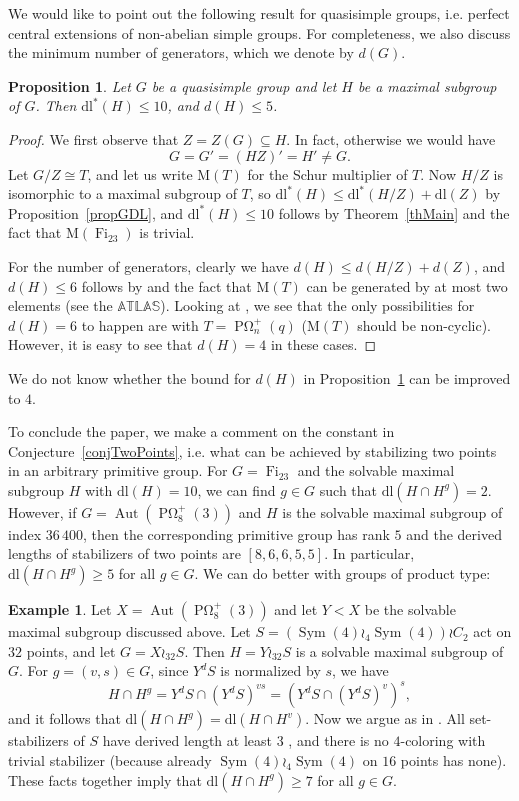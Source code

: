 \documentclass[11pt]{amsart}
\numberwithin{equation}{section}
\newtheorem{proposition}[theorem]{Proposition}
\theoremstyle{definition}
\newtheorem{example}[theorem]{Example}
\theoremstyle{remark}
\newcommand{\Sym}{\mathop{\mathrm{Sym}}}
\newcommand{\Aut}{\mathop{\mathrm{Aut}}}
\newcommand{\Fi}{\mathop{\mathrm{Fi}}}
\newcommand{\dll}{\mathrm{dl^*}}
\newcommand{\dl}{\mathrm{dl}}
\DeclareMathOperator{\POmega}{P \Omega}
\newcommand{\Atlas}{\mathbb{A}\mathbb{T}\mathbb{L}\mathbb{A}\mathbb{S}}
\begin{document}
We would like to point out the following result for quasisimple groups,
i.e. perfect central extensions of non-abelian simple groups.
For completeness, we also discuss the minimum
number of generators, which we denote by $d(G)$.

\begin{proposition} \label{propQS}
Let $G$ be a quasisimple group and let $H$ be a maximal subgroup of
$G$. Then $\dll(H) \leq 10$, and $d(H) \leq 5$.
\end{proposition}
\begin{proof}
We first observe that $Z = Z(G) \subseteq H$.
In fact, otherwise we would have
$$ G = G' = (HZ)' = H' \neq G. $$
Let $G/Z \cong T$, and let us write $\mathrm{M}(T)$ for the Schur multiplier of $T$.
Now $H/Z$ is isomorphic to a maximal subgroup of $T$, so $\dll(H) \leq \dll(H/Z) + \dl(Z)$ by Proposition~\ref{propGDL},
and $\dll(H) \leq 10$ follows by Theorem~\ref{thMain}
and the fact that $\mathrm{M}(\Fi_{23})$ is trivial.

For the number of generators, clearly we have $d(H) \leq d(H/Z) + d(Z)$,
and $d(H) \leq 6$ follows by \cite{BLS13} and the fact that $\mathrm{M}(T)$ can be generated by at most two elements (see the $\Atlas$).
Looking at \cite[Tab.~1]{LMT20},
we see that the only possibilities for $d(H) = 6$ to happen are with
$T = \POmega^+_n(q)$ ($\mathrm{M}(T)$ should be non-cyclic).
However, it is easy to see that $d(H) = 4$ in these cases.
\end{proof}

We do not know whether the bound for $d(H)$ in Proposition~\ref{propQS} can be improved to $4$.

To conclude the paper, we make a comment on the constant in Conjecture~\ref{conjTwoPoints},
i.e. what can be achieved by stabilizing two points in an arbitrary primitive group.
For $G=\Fi_{23}$ and the solvable maximal subgroup $H$ with $\dl(H) =10$, we can find $g \in G$ such that $\dl(H \cap H^g) =2$.
However, if $G=\Aut(\POmega_8^+(3))$ and $H$ is the solvable maximal subgroup of index $36\,400$, then the corresponding primitive group has rank $5$ and the derived lengths of stabilizers of two points are $[8,6,6,5,5]$. In particular, $\dl(H \cap H^g) \geq 5$ for all $g \in G$.
We can do better with groups of product type:

\begin{example} \label{exBad2}
Let $X = \Aut(\POmega_8^+(3))$ and let $Y<X$ be the solvable maximal subgroup discussed above.
Let $S = (\Sym(4) \wr_4 \Sym(4)) \wr C_2$ act on $32$ points,
and let $G = X \wr_{32} S$.
Then $H = Y \wr_{32} S$ is a solvable maximal subgroup of $G$.
For $g = (v,s) \in G$, since $Y^d S$ is normalized by $s$, we have
$$ H \cap H^g = Y^dS \cap (Y^dS)^{vs} = (Y^d S \cap (Y^d S)^v)^s , $$
and it follows that $\dl(H \cap H^g) = \dl(H \cap H^v)$.
Now we argue as in \cite[Sec.~3.2]{Sab26}.
All set-stabilizers of $S$ have derived length at least $3$ \cite[Ex.~2.11]{Sab26}, and there is no $4$-coloring with trivial stabilizer (because already $\Sym(4) \wr_4 \Sym(4)$ on $16$ points has none).
These facts together imply that $\dl(H \cap H^g) \geq 7$ for all $g \in G$.
\end{example} 
\end{document}
